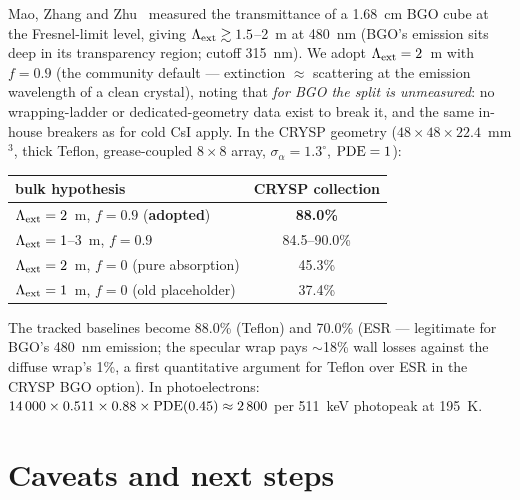 \documentclass[11pt,a4paper]{article}
\newcommand{\lext}{\Lambda_{\rm ext}}
\newcommand{\sa}{\sigma_\alpha}
\begin{document}
Mao, Zhang and Zhu~\cite{mao2008} measured the transmittance of a 1.68~cm BGO cube at
the Fresnel-limit level, giving $\lext \gtrsim 1.5$--2~m at 480~nm (BGO's emission sits
deep in its transparency region; cutoff 315~nm). We adopt $\lext = 2$~m with $f = 0.9$
(the community default --- extinction $\approx$ scattering at the emission wavelength
of a clean crystal), noting that \emph{for BGO the split is unmeasured}: no
wrapping-ladder or dedicated-geometry data exist to break it, and the same in-house
breakers as for cold CsI apply. In the CRYSP geometry
($48\times48\times22.4$~mm$^3$, thick Teflon, grease-coupled $8\times8$ array,
$\sa = 1.3^\circ$, ${\rm PDE}=1$):
\begin{center}
\begin{tabular}{lc}
  \toprule
  bulk hypothesis & CRYSP collection \\
  \midrule
  $\lext = 2$~m, $f = 0.9$ (\textbf{adopted}) & \textbf{88.0\%} \\
  $\lext = 1$--3~m, $f = 0.9$ & 84.5--90.0\% \\
  $\lext = 2$~m, $f = 0$ (pure absorption) & 45.3\% \\
  $\lext = 1$~m, $f = 0$ (old placeholder) & 37.4\% \\
  \bottomrule
\end{tabular}
\end{center}
The tracked baselines become 88.0\% (Teflon) and 70.0\% (ESR --- legitimate for BGO's
480~nm emission; the specular wrap pays $\sim$18\% wall losses against the diffuse
wrap's 1\%, a first quantitative argument for Teflon over ESR in the CRYSP BGO
option). In photoelectrons: $14\,000 \times 0.511 \times 0.88 \times {\rm PDE}(0.45)
\approx 2\,800$ per 511~keV photopeak at 195~K.

\section{Caveats and next steps}
\label{sec:caveats}
\end{document}
